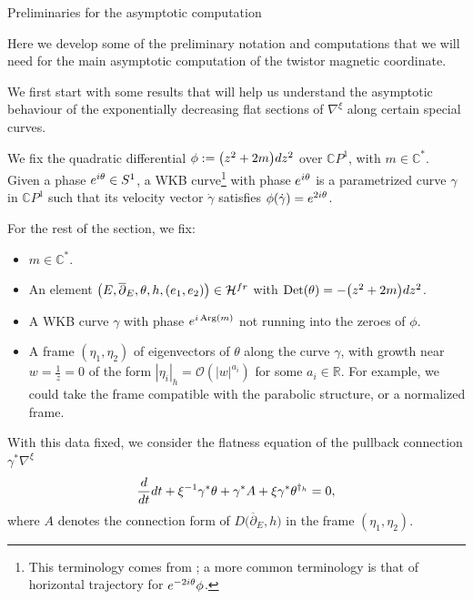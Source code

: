 \documentclass[11pt]{article}
\numberwithin{equation}{section}
\numberwithin{equation}{section}
\newcommand{\CP}{\mathbb{C}P^1}
\begin{document}
\begin{subsubsection}{Preliminaries for the asymptotic computation}

Here we develop some of the preliminary notation and computations that we will need for the main asymptotic computation of the twistor magnetic coordinate.

We first start with some results that will help us understand the asymptotic behaviour of the exponentially decreasing flat sections of $\nabla^{\xi}$ along certain special curves.

\begin{Definition}We fix the quadratic differential $\phi:=\bigl(z^2+2m \bigr){\rm d}z^2$ over $\CP$, with $m\in \mathbb{C}^*$. Given a phase ${\rm e}^{{\rm i}\theta} \in S^1$, a WKB curve\footnote{This terminology comes from \cite{GMN2}; a more common terminology is that of horizontal trajectory for ${\rm e}^{-2{\rm i}\theta}\phi$.} with phase ${\rm e}^{{\rm i}\theta}$ is a parametrized curve $\gamma$ in $\CP$ such that its velocity vector $\dot{\gamma}$ satisfies $
 \phi (\dot{\gamma})= {\rm e}^{2{\rm i}\theta}$.
\end{Definition}

For the rest of the section, we fix:
\begin{itemize}\itemsep=0pt
 \item $m\in \mathbb{C}^*$.
 \item An element $\bigl(E,\overline{\partial}_E,\theta,h,(e_1,e_2)\bigr)\in \mathcal{H}^{{\rm fr}}$ with $\operatorname{Det}(\theta)=-\bigl(z^2+2m\bigr){\rm d}z^2$.
 \item A WKB curve $\gamma$ with phase ${\rm e}^{{\rm i} \operatorname{Arg}(m)}$ not running into the zeroes of $\phi$.
 \item A frame $(\eta_1,\eta_2)$ of eigenvectors of $\theta$ along the curve $\gamma$, with growth near $w=\frac{1}{z}=0$ of the form $|\eta_i|_h=\mathcal{O}(|w|^{a_i})$ for some $a_i \in \mathbb{R}$. For example, we could take the frame compatible with the parabolic structure, or a normalized frame.
\end{itemize}

With this data fixed, we consider the flatness equation of the pullback connection $\gamma^*\nabla^{\xi}$
\begin{equation*}
 \frac{{\rm d}}{{\rm d}t}{\rm d}t +\xi^{-1}\gamma^*\theta + \gamma^*A + \xi \gamma^* \theta ^{\dagger_h}=0,
\end{equation*}
where $A$ denotes the connection form of $D\bigl(\overline{\partial}_E,h\bigr)$ in the frame $(\eta_1,\eta_2)$.


\end{subsubsection}
\end{document}
